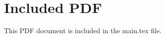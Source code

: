\documentclass[letterpaper,12pt]{article}
\begin{document}
\section{Included PDF}

This PDF document is included in the main.tex file.
\end{document}
